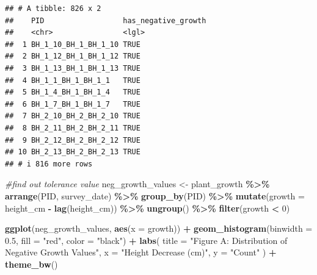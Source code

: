 \documentclass[
]{article}
\newenvironment{Shaded}{\begin{snugshade}}{\end{snugshade}}
\newcommand{\AttributeTok}[1]{\textcolor[rgb]{0.13,0.29,0.53}{#1}}
\newcommand{\CommentTok}[1]{\textcolor[rgb]{0.56,0.35,0.01}{\textit{#1}}}
\newcommand{\DecValTok}[1]{\textcolor[rgb]{0.00,0.00,0.81}{#1}}
\newcommand{\FloatTok}[1]{\textcolor[rgb]{0.00,0.00,0.81}{#1}}
\newcommand{\FunctionTok}[1]{\textcolor[rgb]{0.13,0.29,0.53}{\textbf{#1}}}
\newcommand{\NormalTok}[1]{#1}
\newcommand{\OtherTok}[1]{\textcolor[rgb]{0.56,0.35,0.01}{#1}}
\newcommand{\SpecialCharTok}[1]{\textcolor[rgb]{0.81,0.36,0.00}{\textbf{#1}}}
\newcommand{\StringTok}[1]{\textcolor[rgb]{0.31,0.60,0.02}{#1}}
\begin{document}
\begin{verbatim}
## # A tibble: 826 x 2
##    PID                  has_negative_growth
##    <chr>                <lgl>              
##  1 BH_1_10_BH_1_BH_1_10 TRUE               
##  2 BH_1_12_BH_1_BH_1_12 TRUE               
##  3 BH_1_13_BH_1_BH_1_13 TRUE               
##  4 BH_1_1_BH_1_BH_1_1   TRUE               
##  5 BH_1_4_BH_1_BH_1_4   TRUE               
##  6 BH_1_7_BH_1_BH_1_7   TRUE               
##  7 BH_2_10_BH_2_BH_2_10 TRUE               
##  8 BH_2_11_BH_2_BH_2_11 TRUE               
##  9 BH_2_12_BH_2_BH_2_12 TRUE               
## 10 BH_2_13_BH_2_BH_2_13 TRUE               
## # i 816 more rows
\end{verbatim}

\begin{Shaded}
\begin{Highlighting}[]
\CommentTok{\#find out tolerance value}
\NormalTok{neg\_growth\_values }\OtherTok{\textless{}{-}}\NormalTok{ plant\_growth }\SpecialCharTok{\%\textgreater{}\%}
  \FunctionTok{arrange}\NormalTok{(PID, survey\_date) }\SpecialCharTok{\%\textgreater{}\%}
  \FunctionTok{group\_by}\NormalTok{(PID) }\SpecialCharTok{\%\textgreater{}\%}
  \FunctionTok{mutate}\NormalTok{(}\AttributeTok{growth =}\NormalTok{ height\_cm }\SpecialCharTok{{-}} \FunctionTok{lag}\NormalTok{(height\_cm)) }\SpecialCharTok{\%\textgreater{}\%}
  \FunctionTok{ungroup}\NormalTok{() }\SpecialCharTok{\%\textgreater{}\%}
  \FunctionTok{filter}\NormalTok{(growth }\SpecialCharTok{\textless{}} \DecValTok{0}\NormalTok{)}

\FunctionTok{ggplot}\NormalTok{(neg\_growth\_values, }\FunctionTok{aes}\NormalTok{(}\AttributeTok{x =}\NormalTok{ growth)) }\SpecialCharTok{+}
  \FunctionTok{geom\_histogram}\NormalTok{(}\AttributeTok{binwidth =} \FloatTok{0.5}\NormalTok{, }\AttributeTok{fill =} \StringTok{"red"}\NormalTok{, }\AttributeTok{color =} \StringTok{"black"}\NormalTok{) }\SpecialCharTok{+}
  \FunctionTok{labs}\NormalTok{(}
    \AttributeTok{title =} \StringTok{"Figure A: Distribution of Negative Growth Values"}\NormalTok{,}
    \AttributeTok{x =} \StringTok{"Height Decrease (cm)"}\NormalTok{,}
    \AttributeTok{y =} \StringTok{"Count"}
\NormalTok{  ) }\SpecialCharTok{+}
  \FunctionTok{theme\_bw}\NormalTok{()}
\end{Highlighting}
\end{Shaded}
\end{document}
